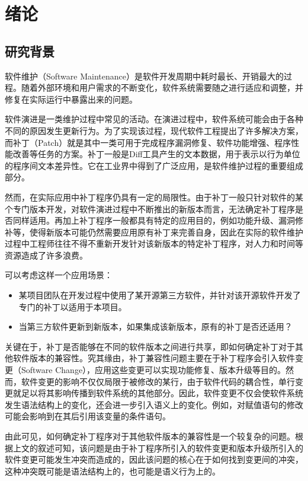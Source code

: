 \chapter{绪论}
\section{研究背景}
\label{sec:background}

软件维护（Software Maintenance）是软件开发周期中耗时最长、开销最大的过程\cite{lehnert2011review}。随着外部环境和用户需求的不断变化，软件系统需要随之进行适应和调整，并修复在实际运行中暴露出来的问题。

软件演进是一类维护过程中常见的活动\cite{pigoski1996practical}。在演进过程中，软件系统可能会由于各种不同的原因发生更新行为。为了实现该过程，现代软件工程提出了许多解决方案，而补丁（Patch）就是其中一类可用于完成程序漏洞修复、软件功能增强、程序性能改善等任务的方案。补丁一般是Diff工具产生的文本数据\cite{hunt1976algorithm}，用于表示以行为单位的程序间文本差异性。它在工业界中得到了广泛应用，是软件维护过程的重要组成部分\cite{le2014patch}。

然而，在实际应用中补丁程序仍具有一定的局限性。由于补丁一般只针对软件的某个专门版本开发，对软件演进过程中不断推出的新版本而言，无法确定补丁程序是否同样适用。再加上补丁程序一般都具有特定的应用目的，例如功能升级、漏洞修补等，使得新版本可能仍然需要应用原有补丁来完善自身，因此在实际的软件维护过程中工程师往往不得不重新开发针对该新版本的特定补丁程序，对人力和时间等资源造成了许多浪费。

可以考虑这样一个应用场景：
\begin{itemize}
	\item 某项目团队在开发过程中使用了某开源第三方软件，并针对该开源软件开发了专门的补丁以适用于本项目。
	\item 当第三方软件更新到新版本，如果集成该新版本，原有的补丁是否还适用？
\end{itemize}

关键在于，补丁是否能够在不同的软件版本之间进行共享，即如何确定补丁对于其他软件版本的兼容性。究其缘由，补丁兼容性问题主要在于补丁程序会引入软件变更（Software Change）\cite{buckley2005towards}，应用这些变更可以实现功能修复、版本升级等目的。然而，软件变更的影响不仅仅局限于被修改的某行，由于软件代码的耦合性，单行变更就足以将其影响传播到软件系统的其他部分\cite{wilkerson2012software,tao2012software}。因此，软件变更不仅会使软件系统发生语法结构上的变化，还会进一步引入语义上的变化。例如，对赋值语句的修改可能会影响到在其后引用该变量的条件语句。

由此可见，如何确定补丁程序对于其他软件版本的兼容性是一个较复杂的问题。根据上文的叙述可知，该问题是由于补丁程序所引入的软件变更和版本升级所引入的软件变更可能发生冲突而造成的，因此该问题的核心在于如何找到变更间的冲突，这种冲突既可能是语法结构上的，也可能是语义行为上的。

